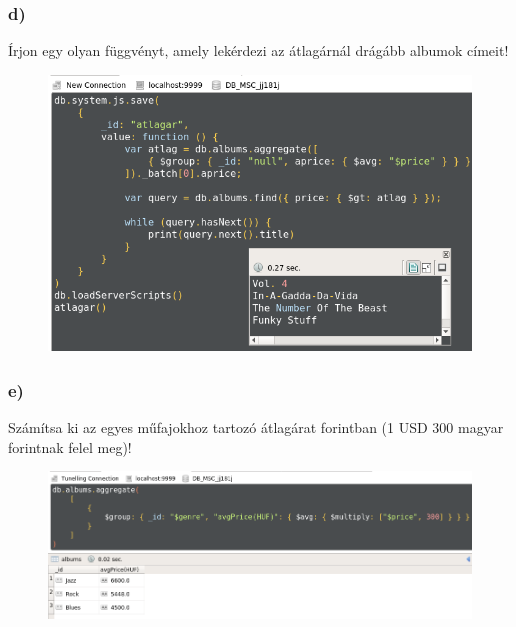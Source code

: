 \documentclass[a4paper, 12pt]{article}
\begin{document}
\subsubsection*{d)}
Írjon egy olyan függvényt, amely lekérdezi az átlagárnál drágább albumok címeit!
\begin{figure}[!hb]
	\centering
	\includegraphics[scale = 0.65]{images/2_d1.png}
	\label{fig:2_d1}
\end{figure}
\clearpage
\subsubsection*{e)}
Számítsa ki az egyes műfajokhoz tartozó átlagárat forintban (1 USD 300 magyar forintnak felel meg)!
\begin{figure}[!hb]
	\centering
	\includegraphics[scale = 0.5]{images/2_e1.png}
	\label{fig:2_e1}
\end{figure}
\end{document}
